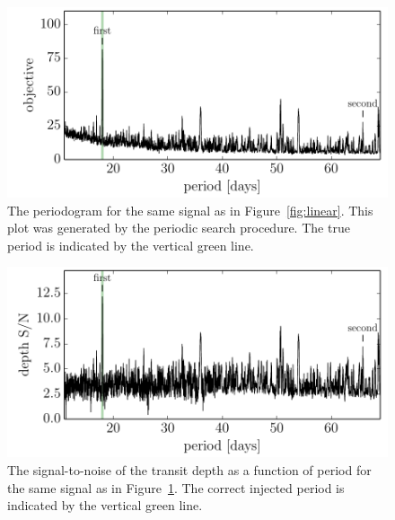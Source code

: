 \documentclass[12pt,preprint]{aastex}
\newcommand{\figref}[1]{\ref{fig:#1}}
\newcommand{\Fig}[1]{Figure~\figref{#1}}
\newcommand{\fig}[1]{\Fig{#1}}
\newcommand{\figlabel}[1]{\label{fig:#1}}
\begin{document}
\begin{figure}[p]
\begin{center}
\includegraphics{figures/periodic.pdf}
\end{center}
\caption{%
The periodogram for the same signal as in \fig{linear}.
This plot was generated by the periodic search procedure.
The true period is indicated by the vertical green line.
\figlabel{periodic}}
\end{figure}

\begin{figure}[p]
\begin{center}
\includegraphics{figures/depth_s2n.pdf}
\end{center}
\caption{%
The signal-to-noise of the transit depth as a function of period for the same
signal as in \fig{periodic}.
The correct injected period is indicated by the vertical green line.
\figlabel{depth-s2n}}
\end{figure}
\end{document}
